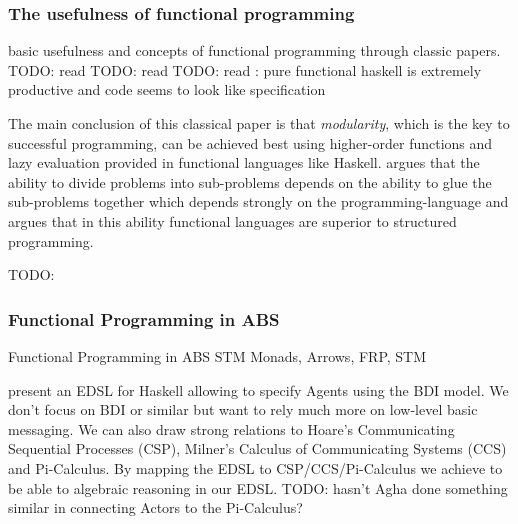 \subsubsection{The usefulness of functional programming}
basic usefulness and concepts of functional programming through classic papers. 
TODO: read \cite{hughes_why_1989}
TODO: read \cite{wadler_essence_1992}
TODO: read \cite{hudak_haskell_1994}: pure functional haskell is extremely productive and code seems to look like specification 

The main conclusion of this classical paper is that \textit{modularity}, which is the key to successful programming, can be achieved best using higher-order functions and lazy evaluation provided in functional languages like Haskell. \cite{hughes_why_1989} argues that the ability to divide problems into sub-problems depends on the ability to glue the sub-problems together which depends strongly on the programming-language and \cite{hughes_why_1989} argues that in this ability functional languages are superior to structured programming.

TODO: \cite{hudak_history_2007}

\subsubsection{Functional Programming in ABS}
Functional Programming in ABS
STM Monads, Arrows, FRP, STM
\cite{Bezirgiannis2013}

\cite{sulzmann_specifying_2007} present an EDSL for Haskell allowing to specify Agents using the BDI model. We don't focus on BDI or similar but want to rely much more on low-level basic messaging. We can also draw strong relations to Hoare's Communicating Sequential Processes (CSP), Milner's Calculus of Communicating Systems (CCS) and Pi-Calculus. By mapping the EDSL to CSP/CCS/Pi-Calculus we achieve to be able to algebraic reasoning in our EDSL. TODO: hasn't Agha done something similar in connecting Actors to the Pi-Calculus?

